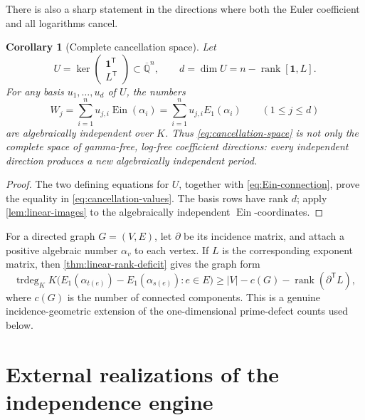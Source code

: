 \documentclass[11pt]{article}
\newtheorem{corollary}[theorem]{Corollary}
\theoremstyle{definition}
\theoremstyle{remark}
\newcommand{\Qbar}{\overline{\mathbb Q}}
\newcommand{\Ein}{\operatorname{Ein}}
\newcommand{\trdeg}{\operatorname{trdeg}}
\begin{document}
There is also a sharp statement in the directions where both the Euler
coefficient and all logarithms cancel.

\begin{corollary}[Complete cancellation space]
\label{cor:complete-cancellation-space}
Let
\begin{equation}\label{eq:cancellation-space}
 U=\ker\begin{pmatrix}\mathbf1^{\mathsf T}\\L^{\mathsf T}\end{pmatrix}
 \subset\Qbar^n,
 \qquad
 d=\dim U=n-\operatorname{rank}[\mathbf1,L].
\end{equation}
For any basis \(u_1,\ldots,u_d\) of \(U\), the numbers
\begin{equation}\label{eq:cancellation-values}
 W_j=\sum_{i=1}^n u_{j,i}\Ein(\alpha_i)
     =\sum_{i=1}^n u_{j,i}E_1(\alpha_i)
 \qquad(1\le j\le d)
\end{equation}
are algebraically independent over \(K\).  Thus
\eqref{eq:cancellation-space} is not only the complete space of
gamma-free, log-free coefficient directions: every independent direction
produces a new algebraically independent period.
\end{corollary}

\begin{proof}
The two defining equations for \(U\), together with
\eqref{eq:Ein-connection}, prove the equality in
\eqref{eq:cancellation-values}.  The basis rows have rank \(d\); apply
\cref{lem:linear-images} to the algebraically independent \(\Ein\)-coordinates.
\end{proof}

For a directed graph \(G=(V,E)\), let \(\partial\) be its incidence matrix,
and attach a positive algebraic number \(\alpha_v\) to each vertex.  If
\(L\) is the corresponding exponent matrix, then
\cref{thm:linear-rank-deficit} gives the graph form
\begin{equation}\label{eq:graph-rank-deficit}
 \trdeg_KK\bigl(E_1(\alpha_{t(e)})-E_1(\alpha_{s(e)}):e\in E\bigr)
 \ge |V|-c(G)-\operatorname{rank}(\partial^{\mathsf T}L),
\end{equation}
where \(c(G)\) is the number of connected components.  This is a genuine
incidence-geometric extension of the one-dimensional prime-defect counts
used below.

\section{External realizations of the independence engine}
\label{sec:external-realizations}
\end{document}
